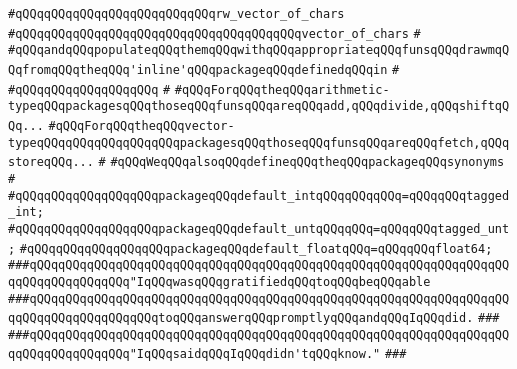 \verb|#qQQqqQQqqQQqqQQqqQQqqQQqqQQqrw_vector_of_chars|\newline
\verb|#qQQqqQQqqQQqqQQqqQQqqQQqqQQqqQQqqQQqqQQqvector_of_chars|\newline
\verb|#|\newline
\verb|#qQQqandqQQqpopulateqQQqthemqQQqwithqQQqappropriateqQQqfunsqQQqdrawmqQQqfromqQQqtheqQQq'inline'qQQqpackageqQQqdefinedqQQqin|\newline
\verb|#|\newline
\verb|#qQQqqQQqqQQqqQQqqQQq|\newline
\verb|#|\newline
\verb|#qQQqForqQQqtheqQQqarithmetic-typeqQQqpackagesqQQqthoseqQQqfunsqQQqareqQQqadd,qQQqdivide,qQQqshiftqQQq...|\newline
\verb|#qQQqForqQQqtheqQQqvector-typeqQQqqQQqqQQqqQQqqQQqpackagesqQQqthoseqQQqfunsqQQqareqQQqfetch,qQQqstoreqQQq...|\newline
\verb|#|\newline
\verb|#qQQqWeqQQqalsoqQQqdefineqQQqtheqQQqpackageqQQqsynonyms|\newline
\verb|#|\newline
\verb|#qQQqqQQqqQQqqQQqqQQqpackageqQQqdefault_intqQQqqQQqqQQq=qQQqqQQqtagged_int;|\newline
\verb|#qQQqqQQqqQQqqQQqqQQqpackageqQQqdefault_untqQQqqQQq=qQQqqQQqtagged_unt;|\newline
\verb|#qQQqqQQqqQQqqQQqqQQqpackageqQQqdefault_floatqQQq=qQQqqQQqfloat64;|\newline
\newline
\newline
\newline
\newline
\newline
\verb|###qQQqqQQqqQQqqQQqqQQqqQQqqQQqqQQqqQQqqQQqqQQqqQQqqQQqqQQqqQQqqQQqqQQqqQQqqQQqqQQqqQQq"IqQQqwasqQQqgratifiedqQQqtoqQQqbeqQQqable|\newline
\verb|###qQQqqQQqqQQqqQQqqQQqqQQqqQQqqQQqqQQqqQQqqQQqqQQqqQQqqQQqqQQqqQQqqQQqqQQqqQQqqQQqqQQqqQQqtoqQQqanswerqQQqpromptlyqQQqandqQQqIqQQqdid.|\newline
\verb|###|\newline
\verb|###qQQqqQQqqQQqqQQqqQQqqQQqqQQqqQQqqQQqqQQqqQQqqQQqqQQqqQQqqQQqqQQqqQQqqQQqqQQqqQQqqQQq"IqQQqsaidqQQqIqQQqdidn'tqQQqknow."|\newline
\verb|###|\newline
